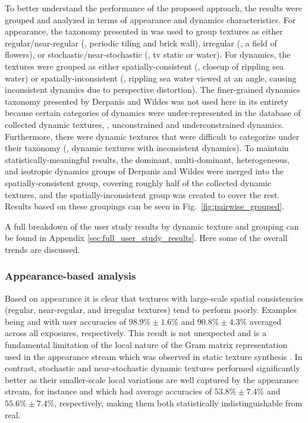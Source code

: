 To better understand the performance of the proposed approach,
the results were grouped and analyzed in terms of
appearance and dynamics characteristics.
For appearance, the taxonomy
presented in \cite{lin2006quantitative} was used to group textures as
either regular/near-regular (\eg, periodic tiling and brick wall), 
irregular (\eg, a field of flowers), or
stochastic/near-stochastic (\eg, tv static or water).
For dynamics, the textures were grouped as either 
spatially-consistent (\eg, closeup of rippling sea water) or 
spatially-inconsistent (\eg, rippling sea water viewed at an angle, causing inconsistent dynamics due to perspective distortion). The finer-grained dynamics taxonomy presented by Derpanis and Wildes \cite{derpanis2012spacetime} was not used here in its entirety because certain categories of dynamics were under-represented in the database of collected dynamic textures, \eg, unconstrained and underconstrained dynamics. Furthermore, there were dynamic textures that were difficult to categorize under their taxonomy (\ie, dynamic textures with inconsistent dynamics). To maintain statistically-meaningful results, the dominant, multi-dominant, heterogeneous, and isotropic dynamics groups of Derpanis and Wildes \cite{derpanis2012spacetime} were merged into the spatially-consistent group, covering roughly half of the collected dynamic textures, and the spatially-inconsistent group was created to cover the rest.
Results based on these groupings can be seen in
Fig.\ \ref{fig:pairwise_grouped}.



A full breakdown of the user study results by dynamic texture and 
grouping can be found in Appendix \ref{sec:full_user_study_results}.
Here some of the overall trends are discussed.

\subsubsection{Appearance-based analysis}

Based on appearance it is clear that textures with
large-scale spatial consistencies (regular, near-regular, 
and irregular textures) tend to perform poorly.
Examples being  and  with
user accuracies of $98.9\% \pm 1.6\%$ and $90.8\% \pm 4.3\%$ 
averaged across all exposures, respectively.
This result is not unexpected and is a fundamental limitation of the 
local nature of the Gram matrix representation used in the 
appearance stream which was observed in static texture synthesis 
\cite{gatys2015}.
In contrast, stochastic and near-stochastic dynamic textures 
performed significantly better as their smaller-scale local 
variations are well captured by the appearance stream, for 
instance  and  which had 
average accuracies of $53.8\% \pm 7.4\%$ and
$55.6\% \pm 7.4\%$, respectively, making them both 
statistically indistinguishable from real.

